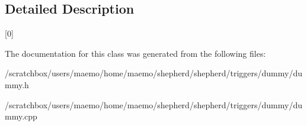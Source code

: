 \subsection{Detailed Description}
\mbox{[}0\mbox{]} 

The documentation for this class was generated from the following files:\begin{CompactItemize}
\item 
/scratchbox/users/maemo/home/maemo/shepherd/shepherd/triggers/dummy/dummy.h\item 
/scratchbox/users/maemo/home/maemo/shepherd/shepherd/triggers/dummy/dummy.cpp\end{CompactItemize}
